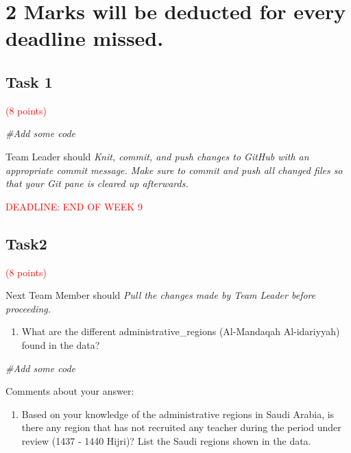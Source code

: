 \documentclass[
]{article}
\newenvironment{Shaded}{\begin{snugshade}}{\end{snugshade}}
\newcommand{\CommentTok}[1]{\textcolor[rgb]{0.56,0.35,0.01}{\textit{#1}}}
\providecommand{\tightlist}{%
  \setlength{\itemsep}{0pt}\setlength{\parskip}{0pt}}
\begin{document}
\hypertarget{marks-will-be-deducted-for-every-deadline-missed.}{%
\section{2 Marks will be deducted for every deadline
missed.}\label{marks-will-be-deducted-for-every-deadline-missed.}}

\hypertarget{task-1}{%
\subsection{Task 1}\label{task-1}}

\textcolor{red}{(8 points)}

\begin{Shaded}
\begin{Highlighting}[]
\CommentTok{\#Add some code}
\end{Highlighting}
\end{Shaded}

Team Leader should \emph{Knit, commit, and push changes to GitHub with
an appropriate commit message. Make sure to commit and push all changed
files so that your Git pane is cleared up afterwards.}

\textcolor{red}{DEADLINE: END OF WEEK 9}

\hypertarget{task2}{%
\subsection{Task2}\label{task2}}

\textcolor{red}{(8 points)}

Next Team Member should \emph{Pull the changes made by Team Leader
before proceeding.}

\begin{enumerate}
\def\labelenumi{(\alph{enumi})}
\tightlist
\item
  What are the different administrative\_regions (Al-Mandaqah
  Al-idariyyah) found in the data?
\end{enumerate}

\begin{Shaded}
\begin{Highlighting}[]
\CommentTok{\#Add some code}
\end{Highlighting}
\end{Shaded}

Comments about your answer:

\begin{enumerate}
\def\labelenumi{(\alph{enumi})}
\setcounter{enumi}{1}
\tightlist
\item
  Based on your knowledge of the administrative regions in Saudi Arabia,
  is there any region that has not recruited any teacher during the
  period under review (1437 - 1440 Hijri)? List the Saudi regions shown
  in the data.
\end{enumerate}
\end{document}
